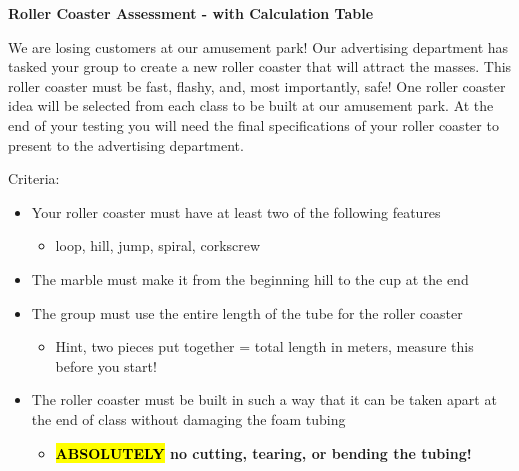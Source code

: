 \documentclass[12pt, fleqn, paper=letter]{scrartcl}
\newcommand{\maintitle}{Roller Coaster Assessment - with Calculation Table}
\begin{document}
\begin{center}
\huge \textbf{\maintitle}
\end{center}

We are losing customers at our amusement park!
Our advertising department has tasked your group to create a new roller coaster that will attract the masses.
This roller coaster must be fast, flashy, and, most importantly, safe!
One roller coaster idea will be selected from each class to be built at our amusement park.
At the end of your testing you will need the final specifications of your roller coaster to present to the advertising department.

Criteria:
\begin{itemize}
\item Your roller coaster must have at least two of the following features
	\begin{itemize}
	\item loop, hill, jump, spiral, corkscrew
	\end{itemize}

\item The marble must make it from the beginning hill to the cup at the end

\item The group must use the entire length of the tube for the roller coaster
	\begin{itemize}
	\item Hint, two pieces put together = total length in meters, measure this before you start!
	\end{itemize}

\item The roller coaster must be built in such a way that it can be taken apart at the end of class without damaging the foam tubing
	\begin{itemize}
	\item \textbf{\hl{ABSOLUTELY} no cutting, tearing, or bending the tubing!}
	\end{itemize}
\end{itemize}
\end{document}

